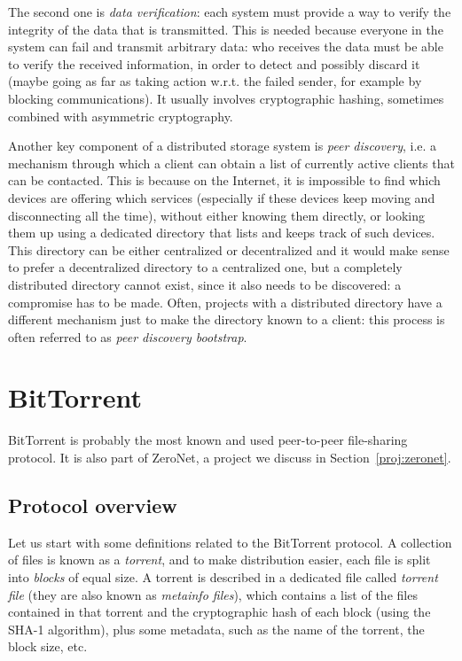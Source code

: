 \documentclass[mscthesis]{usiinfthesis}
\begin{document}
The second one is \emph{data verification}: each system must provide a way to verify the integrity of the data that is transmitted. This is needed because everyone in the system can fail and transmit arbitrary data: who receives the data must be able to verify the received information, in order to detect and possibly discard it (maybe going as far as taking action w.r.t. the failed sender, for example by blocking communications). It usually involves cryptographic hashing, sometimes combined with asymmetric cryptography.

Another key component of a distributed storage system is \emph{peer discovery}, i.e. a mechanism through which a client can obtain a list of currently active clients that can be contacted. This is because on the Internet, it is impossible to find which devices are offering which services (especially if these devices keep moving and disconnecting all the time), without either knowing them directly, or looking them up using a dedicated directory that lists and keeps track of such devices. This directory can be either centralized or decentralized and it would make sense to prefer a decentralized directory to a centralized one, but a completely distributed directory cannot exist, since it also needs to be discovered: a compromise has to be made. Often, projects with a distributed directory have a different mechanism just to make the directory known to a client: this process is often referred to as \textit{peer discovery bootstrap}.

\section{BitTorrent}\label{proj:bittorrent}

BitTorrent is probably the most known and used peer-to-peer file-sharing protocol. It is also part of ZeroNet, a project we discuss in Section~\ref{proj:zeronet}.

\subsection{Protocol overview}

Let us start with some definitions related to the BitTorrent protocol. A collection of files is known as a \emph{torrent}, and to make distribution easier, each file is split into \emph{blocks} of equal size. A torrent is described in a dedicated file called \emph{torrent file} (they are also known as \textit{metainfo files}), which contains a list of the files contained in that torrent and the cryptographic hash of each block (using the SHA-1 algorithm), plus some metadata, such as the name of the torrent, the block size, etc.
\end{document}
